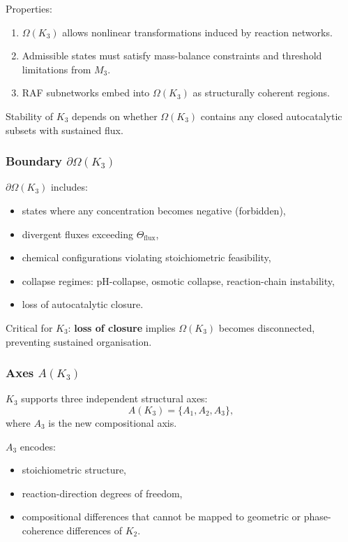 Properties:
\begin{enumerate}
    \item $\Omega(K_3)$ allows nonlinear transformations induced by
          reaction networks.
    \item Admissible states must satisfy mass-balance constraints and
          threshold limitations from $M_3$.
    \item RAF subnetworks embed into $\Omega(K_3)$ as structurally
          coherent regions.
\end{enumerate}

Stability of $K_3$ depends on whether $\Omega(K_3)$ contains any closed
autocatalytic subsets with sustained flux.

\subsubsection{Boundary \texorpdfstring{$\partial\Omega(K_3)$}{\partial\Omega(K_3)}}

$\partial\Omega(K_3)$ includes:
\begin{itemize}
    \item states where any concentration becomes negative (forbidden),
    \item divergent fluxes exceeding $\Theta_{\mathrm{flux}}$,
    \item chemical configurations violating stoichiometric feasibility,
    \item collapse regimes: pH-collapse, osmotic collapse,
          reaction-chain instability,
    \item loss of autocatalytic closure.
\end{itemize}

Critical for $K_3$:
\textbf{loss of closure} implies $\Omega(K_3)$ becomes disconnected,
preventing sustained organisation.

\subsubsection{Axes \texorpdfstring{$A(K_3)$}{A(K_3)}}

$K_3$ supports three independent structural axes:
\[
A(K_3) = \{A_1, A_2, A_3\},
\]
where $A_3$ is the new compositional axis.

$A_3$ encodes:
\begin{itemize}
    \item stoichiometric structure,
    \item reaction-direction degrees of freedom,
    \item compositional differences that cannot be mapped to geometric
          or phase-coherence differences of $K_2$.
\end{itemize}

